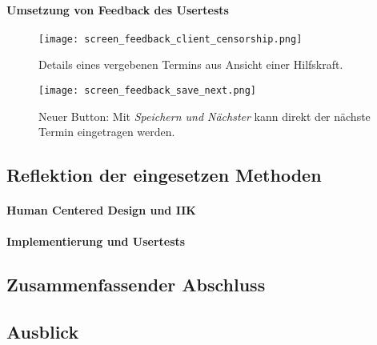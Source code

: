 \paragraph{Umsetzung von Feedback des Usertests}

\begin{figure}[H]
    \caption{Details eines vergebenen Termins aus Ansicht einer Hilfskraft.}
    \centering
    \texttt{[image: screen\_feedback\_client\_censorship.png]}
\end{figure}

\begin{figure}[H]
    \caption{Neuer Button: Mit \textit{Speichern und Nächster} kann direkt der nächste Termin eingetragen werden.}
    \centering
    \texttt{[image: screen\_feedback\_save\_next.png]}
\end{figure}

\subsection{Reflektion der eingesetzen Methoden}
\label{subsection:reflection}

\paragraph{Human Centered Design und IIK}

\paragraph{Implementierung und Usertests}

\subsection{Zusammenfassender Abschluss}
\label{subsection:conclusion}

\subsection{Ausblick}
\label{subsection:outlook}
